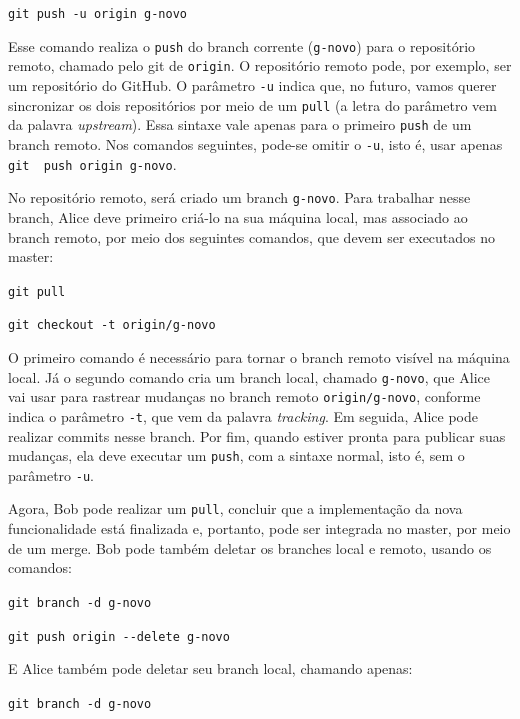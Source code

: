 \documentclass[
  11pt,
  twoside]{book}
\newcommand{\passthrough}[1]{#1}
\begin{document}
\passthrough{\lstinline!git push -u origin g-novo!}

Esse comando realiza o \passthrough{\lstinline!push!} do branch corrente
(\passthrough{\lstinline!g-novo!}) para o repositório remoto, chamado
pelo git de \passthrough{\lstinline!origin!}. O repositório remoto pode,
por exemplo, ser um repositório do GitHub. O parâmetro
\passthrough{\lstinline!-u!} indica que, no futuro, vamos querer
sincronizar os dois repositórios por meio de um
\passthrough{\lstinline!pull!} (a letra do parâmetro vem da palavra
\emph{upstream}). Essa sintaxe vale apenas para o primeiro
\passthrough{\lstinline!push!} de um branch remoto. Nos comandos
seguintes, pode-se omitir o \passthrough{\lstinline!-u!}, isto é, usar
apenas \passthrough{\lstinline!git  push origin g-novo!}.

No repositório remoto, será criado um branch
\passthrough{\lstinline!g-novo!}. Para trabalhar nesse branch, Alice
deve primeiro criá-lo na sua máquina local, mas associado ao branch
remoto, por meio dos seguintes comandos, que devem ser executados no
master:

\passthrough{\lstinline!git pull!}

\passthrough{\lstinline!git checkout -t origin/g-novo!}

O primeiro comando é necessário para tornar o branch remoto visível na
máquina local. Já o segundo comando cria um branch local, chamado
\passthrough{\lstinline!g-novo!}, que Alice vai usar para rastrear
mudanças no branch remoto \passthrough{\lstinline!origin/g-novo!},
conforme indica o parâmetro \passthrough{\lstinline!-t!}, que vem da
palavra \emph{tracking}. Em seguida, Alice pode realizar commits nesse
branch. Por fim, quando estiver pronta para publicar suas mudanças, ela
deve executar um \passthrough{\lstinline!push!}, com a sintaxe normal,
isto é, sem o parâmetro \passthrough{\lstinline!-u!}.

Agora, Bob pode realizar um \passthrough{\lstinline!pull!}, concluir que
a implementação da nova funcionalidade está finalizada e, portanto, pode
ser integrada no master, por meio de um merge. Bob pode também deletar
os branches local e remoto, usando os comandos:

\passthrough{\lstinline!git branch -d g-novo!}

\passthrough{\lstinline!git push origin --delete g-novo!}

E Alice também pode deletar seu branch local, chamando apenas:

\passthrough{\lstinline!git branch -d g-novo!}
\end{document}
